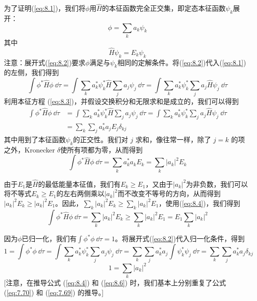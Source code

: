     为了证明(\ref{eq:8.1})，我们将$\phi$用$\hat{H}$的本征函数完全正交集，即定态本征函数$\psi_k$展开：
    \begin{equation}
        \phi = \sum_k a_k \psi_k
        \label{eq:8.2}
    \end{equation}
    其中
    \begin{equation}
        \hat{H}\psi_k = E_k \psi_k
        \label{eq:8.3}
    \end{equation}
    注意：展开式(\ref{eq:8.2})要求$\phi$满足与$\psi_k$相同的定解条件。将(\ref{eq:8.2})代入(\ref{eq:8.1})的左侧，我们得到
    \begin{equation*}
        \int \phi^{\ast}\hat{H}\phi\:\dd \tau = \int \sum_{k}a_k^{\ast} \psi_k^{\ast} \hat{H} \sum_{j} a_j \psi_j \:\dd \tau = \int \sum_{k}a_k^{\ast} \psi_k^{\ast} \sum_{j} a_j \hat{H} \psi_j \:\dd \tau
    \end{equation*}
    利用本征方程 (\ref{eq:8.3})，并假设交换积分和无限求和是成立的，我们可以得到
    \begin{equation*}
        \begin{aligned}
            \int \phi^{\ast}\hat{H}\phi \:\dd \tau &= \int \sum_{k} a_k^{\ast} \psi_k^{\ast} \hat{H} \sum_{j} a_j \psi_j \:\dd \tau = \int \sum_{k} a_k^{\ast} \psi_k^{\ast} \sum_{j} a_j \hat{H} \psi_j \:\dd \tau \\
            &= \sum_k\sum_{j} a_k^{\ast} a_j E_j \delta_{kj}
        \end{aligned}
    \end{equation*}
    其中用到了本征函数$\psi_k$的正交性。我们对 $j$ 求和，像往常一样，除了 $j=k$ 的项之外，Kronecker $\delta$使所有项都为零，从而得到
    \begin{equation}
        \int \phi^{\ast} \hat{H}\phi \:\dd \tau = \sum_{k}a_k^{\ast} a_k E_k = \sum_k |a_k|^2 E_k
        \label{eq:8.4}
    \end{equation}
    
    由于$E_1$是$\hat{H}$的最低能量本征值，我们有$E_k \geq E_1$，又由于$\left|a_k\right|^2$为非负数，我们可以将不等式$E_k \geq E_1$的左右两侧乘以$|a_k|^2$而不改变不等号的方向，从而得到$|a_k|^2 E_k \geq |a_k|^2 E_1$。因此，$\sum_k |a_k|^2 E_k \geq \sum_k |a_k|^2 E_1$，使用(\ref{eq:8.4})，我们得到
    \begin{equation}
        \int \phi^{\ast} \hat{H}\phi \:\dd \tau = \sum_k |a_k|^2 E_k \geq \sum_k |a_k|^2 E_1 = E_1 \sum_k |a_k|^2
        \label{eq:8.5}
    \end{equation}

    因为$\phi$已归一化，我们有$\int \phi^{\ast} \phi \: \dd \tau = 1$。将展开式(\ref{eq:8.2})代入归一化条件，得到
    \begin{equation*}
        1 = \int \phi^{\ast} \phi \: \dd \tau = \int \sum_{k} a_k^{\ast} \psi_k^{\ast} \sum_{j} a_j \psi_j \: \dd \tau = \sum_{k} \sum_{j} a_k^{\ast} a_j \int \psi_k^{\ast} \psi_j \: \dd \tau = \sum_{k} \sum_{j} a_k^{\ast} a_j \delta_{kj}
    \end{equation*}
    \begin{equation}
        1 = \sum_{k} |a_k|^2
        \label{eq:8.6}
    \end{equation}
    [注意，在推导公式 (\ref{eq:8.4}) 和 (\ref{eq:8.6}) 时，我们基本上分别重复了公式 (\ref{eq:7.70}) 和 (\ref{eq:7.69}) 的推导。]


